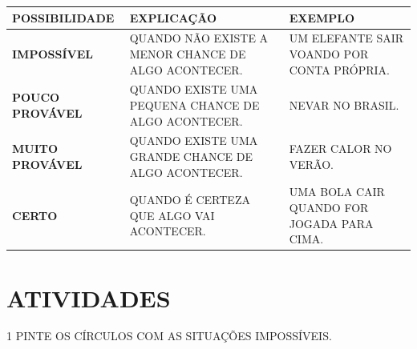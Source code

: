 \begin{table}[H]
    \centering
    \begin{tabular}{|l|l|l|}
    \hline
        \textbf{POSSIBILIDADE} & \textbf{EXPLICAÇÃO} & \textbf{EXEMPLO} \\ \hline
        \textbf{IMPOSSÍVEL} & \parbox{4cm}{QUANDO NÃO EXISTE A MENOR CHANCE DE ALGO ACONTECER.} & \parbox{4cm}{UM ELEFANTE SAIR VOANDO POR CONTA PRÓPRIA.} \\ \hline
        \textbf{POUCO PROVÁVEL} & \parbox{4cm}{QUANDO EXISTE UMA PEQUENA CHANCE DE ALGO ACONTECER.} & \parbox{4cm}{NEVAR NO BRASIL.} \\ \hline
        \textbf{MUITO PROVÁVEL} & \parbox{4cm}{QUANDO EXISTE UMA GRANDE CHANCE DE ALGO ACONTECER.} & \parbox{4cm}{FAZER CALOR NO VERÃO.} \\ \hline
        \textbf{CERTO} & \parbox{4cm}{QUANDO É CERTEZA QUE ALGO VAI ACONTECER.} & \parbox{4cm}{UMA BOLA CAIR QUANDO FOR JOGADA PARA CIMA.} \\ \hline
    \end{tabular}
\end{table}


\section*{ATIVIDADES}

\num{1} PINTE OS CÍRCULOS COM AS SITUAÇÕES IMPOSSÍVEIS.


